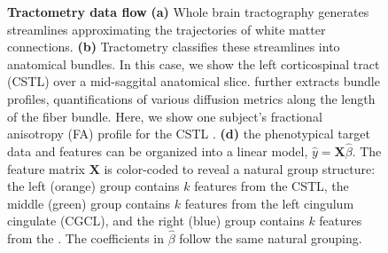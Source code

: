 \documentclass[10pt,letterpaper]{article}
\begin{document}
\begin{figure}[b!]
    {\label{fig:methods:tractogram}}
    {\label{fig:methods:cst}}
    {\label{fig:methods:tract-profile:cst}}
    {\label{fig:methods:tract-profile:fa}}
    {\label{fig:methods:group-structure}}
    \caption{\textbf{Tractometry data flow}
        \label{fig:methods}
        \textbf{(a)} Whole brain tractography generates streamlines approximating
        the trajectories of white matter connections.
        \textbf{(b)} Tractometry classifies these streamlines into anatomical bundles.
        In this case, we show the left corticospinal tract (CSTL)
        over a mid-saggital anatomical slice.
          further extracts bundle profiles,
        quantifications of various diffusion metrics along the length of the
        fiber bundle. Here, we show one subject's fractional anisotropy (FA)
        profile for  the CSTL .
        \textbf{(d)} the phenotypical target data and 
        features can be organized into a linear model, $\hat{y} = \mathbf{X}
        \hat{\beta}$. The feature matrix $\mathbf{X}$ is color-coded
        to reveal a natural group structure: the left (orange) group
        contains $k$ features from the CSTL, the middle (green) group
        contains $k$ features from the left cingulum cingulate (CGCL),
        and the right (blue) group
        contains $k$ features from the .
        The coefficients in $\hat{\beta}$ follow the same natural grouping.
    }
\end{figure}
\end{document}
